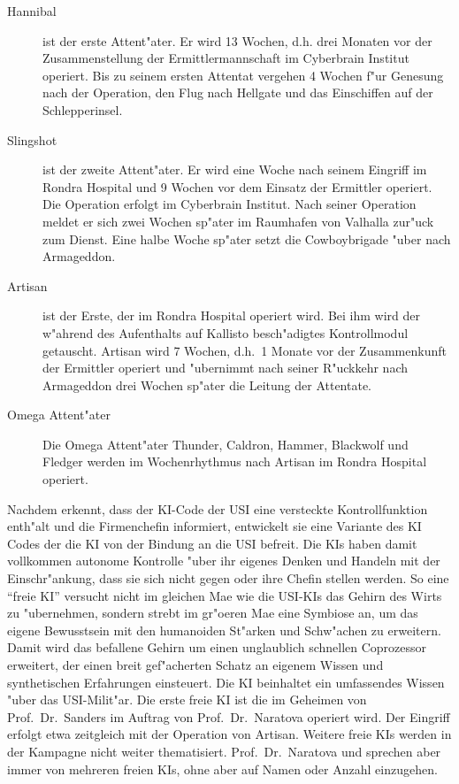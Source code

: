 \begin{description}
    \item[Hannibal] ist der erste Attent"ater. Er wird 13 Wochen, d.h. drei Monaten vor der Zusammenstellung der Ermittlermannschaft im 
        Cyberbrain Institut operiert. Bis zu seinem ersten Attentat vergehen 4 Wochen f"ur Genesung nach der Operation, den Flug nach Hellgate und das Einschiffen auf der Schlepperinsel.
    \item[Slingshot] ist der zweite Attent"ater. Er wird eine Woche nach seinem Eingriff im Rondra Hospital und 9 Wochen vor dem Einsatz 
        der Ermittler operiert. Die Operation erfolgt im Cyberbrain Institut. Nach seiner Operation meldet er sich zwei Wochen sp"ater im Raumhafen von Valhalla zur"uck zum Dienst. Eine halbe Woche sp"ater setzt die Cowboybrigade "uber nach Armageddon.
    \item[Artisan] ist der Erste, der im Rondra Hospital operiert wird. Bei ihm wird der w"ahrend des Aufenthalts auf Kallisto 
        besch"adigtes Kontrollmodul getauscht. Artisan wird 7 Wochen, d.h.~1 Monate vor der Zusammenkunft der Ermittler operiert und "ubernimmt nach seiner R"uckkehr nach Armageddon drei Wochen sp"ater die Leitung der Attentate.
    \item[Omega Attent"ater] Die Omega Attent"ater Thunder, Caldron, Hammer, Blackwolf und Fledger werden im Wochenrhythmus nach Artisan im 
        Rondra Hospital operiert.
\end{description}

Nachdem \ml{} erkennt, dass der KI-Code der USI eine versteckte Kontrollfunktion enth"alt und die Firmenchefin informiert, entwickelt sie eine Variante des KI Codes der die KI von der Bindung an die USI befreit. Die KIs haben damit vollkommen autonome Kontrolle "uber ihr eigenes Denken und Handeln mit der Einschr"ankung, dass sie sich nicht gegen \ml{} oder ihre Chefin stellen werden. So eine "`freie KI"' versucht nicht im gleichen Ma\3e wie die USI-KIs das Gehirn des Wirts zu "ubernehmen, sondern strebt im gr"o\3eren Ma\3e eine Symbiose an, um das eigene Bewusstsein mit den humanoiden St"arken und Schw"achen zu erweitern. Damit wird das befallene Gehirn um einen unglaublich schnellen Coprozessor erweitert, der einen breit gef"acherten Schatz an eigenem Wissen und synthetischen Erfahrungen einsteuert. Die KI beinhaltet ein umfassendes Wissen "uber das USI-Milit"ar. Die erste freie KI ist \xl{} die im Geheimen von Prof.~Dr.~Sanders im Auftrag von Prof.~Dr.~Naratova operiert wird. Der Eingriff erfolgt etwa zeitgleich mit der Operation von Artisan. Weitere freie KIs werden in der Kampagne nicht weiter thematisiert. Prof.~Dr.~Naratova und \ml{} sprechen aber immer von mehreren freien KIs, ohne aber auf Namen oder Anzahl einzugehen.
